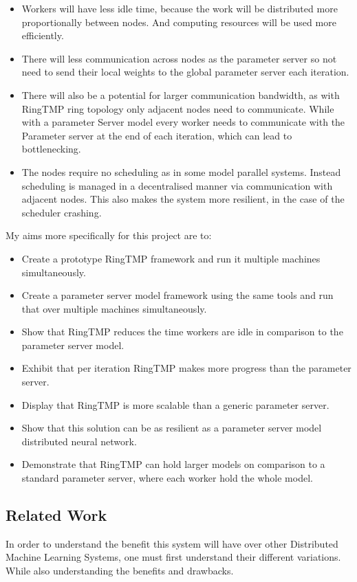 \begin{itemize}
    \item Workers will have less idle time, because the work will be distributed
    more proportionally between nodes. And computing resources will be used more
    efficiently.
    \item There will less communication across nodes as the parameter server so
    not need to send their local weights to the global parameter server each
    iteration.
    \item There will also be a potential for larger communication bandwidth, as
    with RingTMP ring topology only adjacent nodes need to communicate. While
    with a parameter Server model every worker needs to communicate with the
    Parameter server at the end of each iteration, which can lead to
    bottlenecking.
    \item The nodes require no scheduling as in some model parallel systems.
    Instead scheduling is managed in a decentralised manner via communication
    with adjacent nodes. This also makes the system more resilient, in the case
    of the scheduler crashing.
\end{itemize}

My aims more specifically for this project are to:
\begin{itemize}
    \item Create a prototype RingTMP framework and run it multiple machines
    simultaneously.
    \item Create a parameter server model framework using the same tools and run
    that over multiple machines simultaneously.
    \item Show that RingTMP reduces the time workers are idle in comparison to
    the parameter server model.
    \item Exhibit that per iteration RingTMP makes more progress than the parameter
    server.
    \item Display that RingTMP is more scalable than a generic parameter server.
    \item Show that this solution can be as resilient as a parameter server
    model distributed neural network.
    \item Demonstrate that RingTMP can hold larger models on comparison to a
    standard parameter server, where each worker hold the whole model.
\end{itemize}

\subsection{Related Work}
In order to understand the benefit this system will have over other Distributed
Machine Learning Systems, one must first understand their different variations.
While also understanding the benefits and drawbacks.
\par

